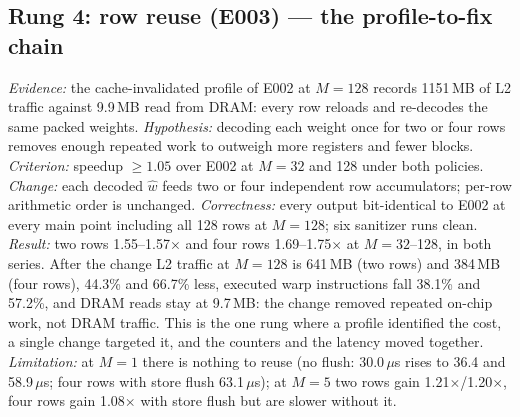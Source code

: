 \documentclass[sigconf,nonacm]{acmart}
\begin{document}
\subsection{Rung 4: row reuse (E003) --- the profile-to-fix chain}
\emph{Evidence:} the cache-invalidated profile of E002 at $M=128$ records 1151\,MB of L2 traffic against 9.9\,MB read from DRAM: every row reloads and re-decodes the same packed weights. \emph{Hypothesis:} decoding each weight once for two or four rows removes enough repeated work to outweigh more registers and fewer blocks. \emph{Criterion:} speedup $\ge 1.05$ over E002 at $M=32$ and 128 under both policies. \emph{Change:} each decoded $\hat w$ feeds two or four independent row accumulators; per-row arithmetic order is unchanged. \emph{Correctness:} every output bit-identical to E002 at every main point including all 128 rows at $M=128$; six sanitizer runs clean. \emph{Result:} two rows 1.55--1.57$\times$ and four rows 1.69--1.75$\times$ at $M=32$--128, in both series. After the change L2 traffic at $M=128$ is 641\,MB (two rows) and 384\,MB (four rows), 44.3\% and 66.7\% less, executed warp instructions fall 38.1\% and 57.2\%, and DRAM reads stay at 9.7\,MB: the change removed repeated on-chip work, not DRAM traffic. This is the one rung where a profile identified the cost, a single change targeted it, and the counters and the latency moved together. \emph{Limitation:} at $M=1$ there is nothing to reuse (no flush: 30.0\,$\mu$s rises to 36.4 and 58.9\,$\mu$s; four rows with store flush 63.1\,$\mu$s); at $M=5$ two rows gain 1.21$\times$/1.20$\times$, four rows gain 1.08$\times$ with store flush but are slower without it.
\end{document}
